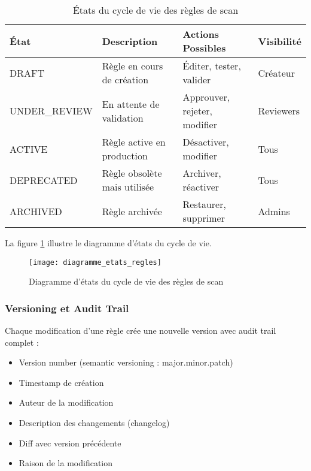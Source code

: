 \begin{table}[htpb]
\centering
\caption{États du cycle de vie des règles de scan}
\label{tab:cycle_vie_regles}
\begin{tabular}{|p{}|p{}|p{}|p{}|}
\hline
\textbf{État} & \textbf{Description} & \textbf{Actions Possibles} & \textbf{Visibilité} \\
\hline
DRAFT & Règle en cours de création & Éditer, tester, valider & Créateur \\
\hline
UNDER\_REVIEW & En attente de validation & Approuver, rejeter, modifier & Reviewers \\
\hline
ACTIVE & Règle active en production & Désactiver, modifier & Tous \\
\hline
DEPRECATED & Règle obsolète mais utilisée & Archiver, réactiver & Tous \\
\hline
ARCHIVED & Règle archivée & Restaurer, supprimer & Admins \\
\hline
\end{tabular}
\end{table}

La figure \ref{fig:diagramme_etats} illustre le diagramme d'états du cycle de vie.

\begin{figure}[htpb]
\centering
\texttt{[image: diagramme\_etats\_regles]}
\caption{Diagramme d'états du cycle de vie des règles de scan}
\label{fig:diagramme_etats}
\end{figure}

\subsubsection{Versioning et Audit Trail}

Chaque modification d'une règle crée une nouvelle version avec audit trail complet :
\begin{itemize}
    \item Version number (semantic versioning : major.minor.patch)
    \item Timestamp de création
    \item Auteur de la modification
    \item Description des changements (changelog)
    \item Diff avec version précédente
    \item Raison de la modification
\end{itemize}

